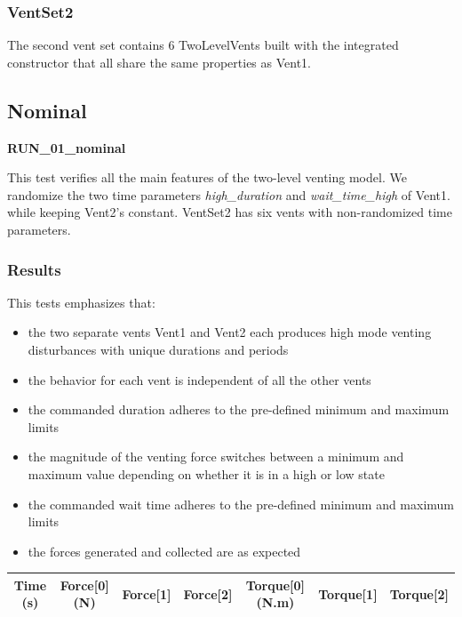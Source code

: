 \documentclass[11pt,fleqn]{report}
\begin{document}
\subsubsection{VentSet2}
The second vent set contains 6 TwoLevelVents built with the integrated constructor that all share the same properties as Vent1.

\newpage
\subsection{Nominal}
\textbf{RUN\_01\_nominal}

\noindent This test verifies all the main features of the two-level venting model. We randomize the two time parameters
 \emph{high\_duration} and \emph{wait\_time\_high} of Vent1. while keeping Vent2's constant. VentSet2 has six vents with
 non-randomized time parameters.

\subsubsection{Results}
This tests emphasizes that:
\begin{itemize} 
    \item the two separate vents Vent1 and Vent2 each produces high mode venting disturbances with unique durations and periods
    \item the behavior for each vent is independent of all the other vents
    \item the commanded duration adheres to the pre-defined minimum and maximum limits
    \item the magnitude of the venting force switches between a minimum and maximum value depending on whether it is in a high or low state
    \item the commanded wait time adheres to the pre-defined minimum and maximum limits
    \item the forces generated and collected are as expected
\end{itemize}

\begin{table}[!ht]
    \centering
    \begin{tabular}{|c|c|c|c|c|c|c|}
    \hline
    \textbf{Time (s)} & \textbf{Force[0] (N)} & \textbf{Force[1]} & \textbf{Force[2]} & \textbf{Torque[0](N.m)} & \textbf{Torque[1]} & \textbf{Torque[2]}\\
    \hline
    \end{tabular}
\end{table}
\end{document}
